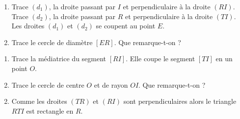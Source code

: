 \begin{myenumerate}
  \setcounter{enumi}{2}
\item
  \begin{enumerate}
  \item Trace $(d_1)$, la droite passant par $I$ et perpendiculaire à
    la droite $(RI)$. Trace $(d_2)$, la droite passant par $R$ et
    perpendiculaire à la droite $(TI)$. Les droites $(d_1)$ et $(d_2)$
    se coupent au point $E$.
\item Trace le cercle de diamètre $[ER]$. Que remarque-t-on ?
  \end{enumerate}
\item
  \begin{enumerate}
  \item Trace la médiatrice du segment $[RI]$. Elle coupe le segment
    $[TI]$ en un point $O$.
  \item Trace le cercle de centre $O$ et de rayon $OI$. Que
    remarque-t-on ?
  \end{enumerate}
\end{myenumerate}
\begin{myenumerate}
\item
  \begin{enumerate}
    \setcounter{enumii}{1}
  \item Comme les droites $(TR)$ et $(RI)$ sont perpendiculaires alors
  le triangle $RTI$ est rectangle en $R$.
  \end{enumerate}
\end{myenumerate}